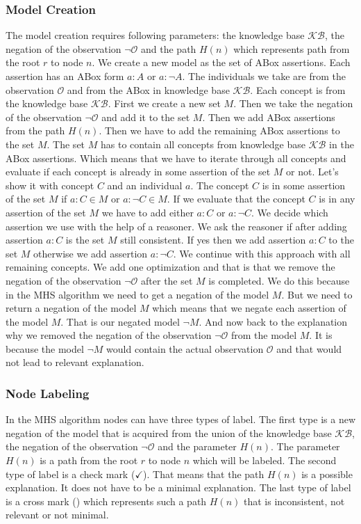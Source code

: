 \documentclass[12pt,a4paper]{article}
\newcommand{\xmark}{\ding{53}}
\begin{document}
\subsubsection{Model Creation}
\label{subsubsection:modelCreation}
The model creation requires following parameters: the knowledge base $\mathcal{KB}$, the negation of the observation $\neg \mathcal{O}$ and the path $H(n)$ which represents path from the root $r$ to node $n$. We create a new model as the set of ABox assertions. Each assertion has an ABox form $a:A$ or $a:\neg A$. The individuals we take are from the observation $\mathcal{O}$ and from the ABox in knowledge base $\mathcal{KB}$. Each concept is from the knowledge base $\mathcal{KB}$. First we create a new set $M$. Then we take the negation of the observation $\neg \mathcal{O}$ and add it to the set $M$. Then we add ABox assertions from the path $H(n)$. Then we have to add the remaining ABox assertions to the set $M$. The set $M$ has to contain all concepts from knowledge base $\mathcal{KB}$ in the ABox assertions. Which means that we have to iterate through all concepts and evaluate if each concept is already in some assertion of the set $M$ or not. Let's show it with concept $C$ and an individual $a$. The concept $C$ is in some assertion of the set $M$ if $a:C \in M$ or $a:\neg C \in M$. If we evaluate that the concept $C$ is in any assertion of the set $M$ we have to add either $a:C$ or $a:\neg C$. We decide which assertion we use with the help of a reasoner. We ask the reasoner if after adding assertion $a:C$ is the set $M$ still consistent. If yes then we add assertion $a:C$ to the set $M$ otherwise we add assertion $a:\neg C$. We continue with this approach with all remaining concepts. We add one optimization and that is that we remove the negation of the observation $\neg \mathcal{O}$ after the set $M$ is completed. We do this because in the MHS algorithm we need to get a negation of the model $M$. But we need to return a negation of the model $M$ which means that we negate each assertion of the model $M$. That is our negated model $\neg M$. And now back to the explanation why we removed the negation of the observation $\neg \mathcal{O}$ from the model $M$. It is because the model $\neg M$ would contain the actual observation $\mathcal{O}$ and that would not lead to relevant explanation.

\subsubsection{Node Labeling}
\label{subsubsection:nodeLabeling}
In the MHS algorithm nodes can have three types of label. The first type is a new negation of the model that is acquired from the union of the knowledge base $\mathcal{KB}$, the negation of the observation $\neg \mathcal{O}$ and the parameter $H(n)$. The parameter $H(n)$ is a path from the root $r$ to node $n$ which will be labeled. The second type of label is a check mark ($\checkmark$). That means that the path $H(n)$ is a possible explanation. It does not have to be a minimal explanation. The last type of label is a cross mark (\xmark) which represents such a path $H(n)$ that is inconsistent, not relevant or not minimal.
\end{document}
